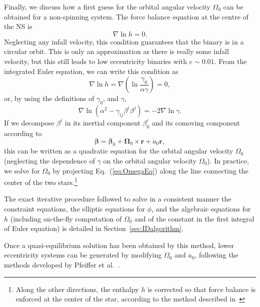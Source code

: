 {Finally, we discuss how a first guess for the orbital angular velocity
$\Omega_0$ can be obtained for a non-spinning system.  The force
balance equation at the centre of the NS is
\begin{equation}\label{eq:Nablah}
\nabla\ln{h}=0.
\end{equation}
Neglecting any infall velocity, this condition guarantees that the
binary is in a circular orbit. This is only an
approximation as there is really some infall velocity, but this still
leads to low eccentricity binaries with $e\sim 0.01$. From the
integrated Euler equation, we can write this condition as
\begin{equation}
\nabla\ln{h} = \nabla\left(\ln{\frac{\gamma_0}{\alpha\gamma}}\right)=0,
\end{equation}
or, by using the definitions of $\gamma_0$, and $\gamma$,
\begin{equation}
\nabla\ln\left(\alpha^2 - \gamma_{ij}\beta^{i}\beta^{j}\right) =
-2\nabla\ln{\gamma}.
\label{eq:OmegaEq}
\end{equation}
If we decompose $\beta^i$ in its inertial component $\beta^i_0$ and
its comoving component according to
\begin{equation}
{\bm \beta} = {\bm \beta}_0 + {\bm \Omega}_0 \times {\bm r} + \dot a_0
{\bm r},
\end{equation}
this can be written as a quadratic equation for the orbital angular
velocity $\Omega_0$ (neglecting the dependence of $\gamma$ on the
orbital angular velocity $\Omega_0$).  In practice, we solve for
$\Omega_0$ by projecting Eq.~(\ref{eq:OmegaEq}) along the line
connecting the center of the two stars.\footnote{Along the other
  directions, the enthalpy $h$ is corrected so that force balance is
  enforced at the center of the star, according to the method
  described in~\cite{Foucart:2010eq}}

The exact iterative procedure followed to solve in a consistent manner
the constraint equations, the elliptic equations for $\phi$, and the
algebraic equations for $h$ (including on-the-fly computation of
$\Omega_0$ and of the constant in the first integral of Euler
equation) is detailed in Section~\ref{sec:IDalgorithm}.

Once a quasi-equilibrium solution has been obtained by this method,
lower eccentricity systems can be generated by modifying $\Omega_0$
and $\dot{a}_0$, following the methods developed by Pfeiffer et
al.~\cite{Pfeiffer-Brown-etal:2007}.

}
